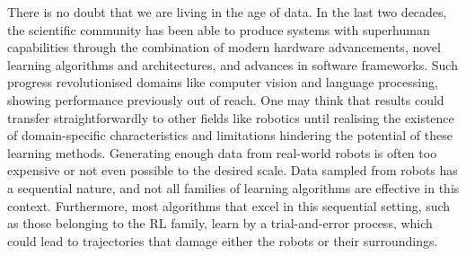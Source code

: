 \begin{addmargin}{-6mm}

\noindent
There is no doubt that we are living in the age of data.
In the last two decades, the scientific community has been able to produce systems with superhuman capabilities through the combination of modern hardware advancements, novel learning algorithms and architectures, and advances in software frameworks.
Such progress revolutionised domains like computer vision and language processing, showing performance previously out of reach.
One may think that results could transfer straightforwardly to other fields like robotics until realising the existence of domain-specific characteristics and limitations hindering the potential of these learning methods.
Generating enough data from real-world robots is often too expensive or not even possible to the desired scale.
Data sampled from robots has a sequential nature, and not all families of learning algorithms are effective in this context.
Furthermore, most algorithms that excel in this sequential setting, such as those belonging to the \ac{RL} family, learn by a trial-and-error process, which could lead to trajectories that damage either the robots or their surroundings.


\end{addmargin}
